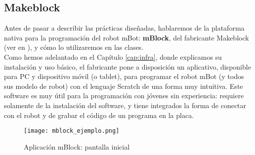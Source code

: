 \subsection{Makeblock}\label{subsec:makeblock}
Antes de pasar a describir las prácticas diseñadas, hablaremos de la plataforma nativa para la programación del robot mBot: \textbf{mBlock}, del fabricante Makeblock (ver en \cite{makeblock}), y cómo lo utilizaremos en las clases. \\
Como hemos adelantado en el Capítulo \ref{cap:infra}, donde explicamos su instalación y uso básico, el fabricante pone a disposición un aplicativo, disponible para PC y dispositivo móvil (o tablet), para programar el robot mBot (y todos sus modelo de robot) con el lenguaje Scratch de una forma muy intuitiva. Este software es muy útil para la programación con jóvenes sin experiencia: requiere solamente de la instalación del software, y tiene integrados la forma de conectar con el robot y de grabar el código de un programa en la placa.\\
\begin{figure}[h]
	\centering
	\texttt{[image: mblock\_ejemplo.png]}
	\label{img:pantallamblock}
	\caption{Aplicación mBlock: pantalla inicial}
\end{figure}

